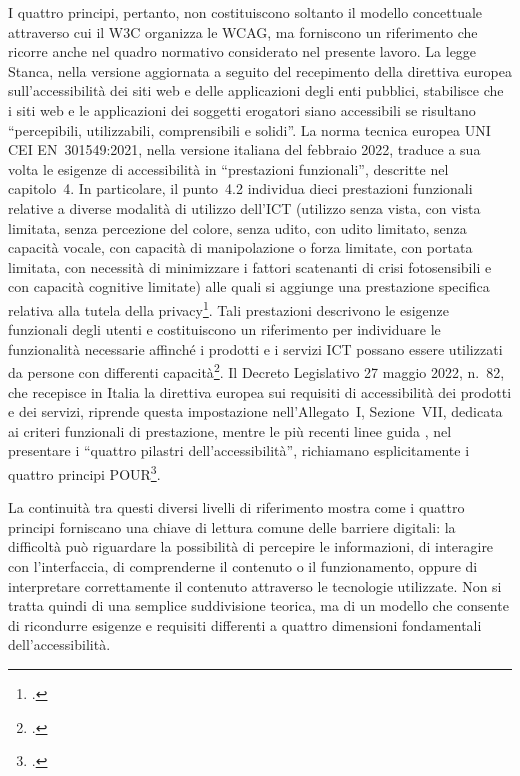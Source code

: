 I quattro principi, pertanto, non costituiscono soltanto il modello concettuale attraverso cui il W3C organizza le WCAG, ma forniscono un riferimento che ricorre anche nel quadro normativo considerato nel presente lavoro. La legge Stanca, nella versione aggiornata a seguito del recepimento della direttiva europea sull'accessibilità dei siti web e delle applicazioni  degli enti pubblici, stabilisce che i siti web e le applicazioni  dei soggetti erogatori siano accessibili se risultano \enquote{percepibili, utilizzabili, comprensibili e solidi}. La norma tecnica europea UNI CEI EN~301549:2021, nella versione italiana del febbraio 2022, traduce a sua volta le esigenze di accessibilità in \enquote{prestazioni funzionali}, descritte nel capitolo~4. In particolare, il punto~4.2 individua dieci prestazioni funzionali relative a diverse modalità di utilizzo dell'ICT (utilizzo senza vista, con vista limitata, senza percezione del colore, senza udito, con udito limitato, senza capacità vocale, con capacità di manipolazione o forza limitate, con portata limitata, con necessità di minimizzare i fattori scatenanti di crisi fotosensibili e con capacità cognitive limitate) alle quali si aggiunge una prestazione specifica relativa alla tutela della privacy\footcite[cap.~4, §~4.2]{norma:en301549}. Tali prestazioni descrivono le esigenze funzionali degli utenti e costituiscono un riferimento per individuare le funzionalità necessarie affinché i prodotti e i servizi ICT possano essere utilizzati da persone con differenti capacità\footcite[cap.~4]{norma:en301549}. Il Decreto Legislativo 27 maggio 2022, n.~82, che recepisce in Italia la direttiva europea sui requisiti di accessibilità dei prodotti e dei servizi, riprende questa impostazione nell'Allegato~I, Sezione~VII, dedicata ai criteri funzionali di prestazione, mentre le più recenti linee guida , nel presentare i \enquote{quattro pilastri dell'accessibilità}, richiamano esplicitamente i quattro principi POUR\footcite[§~6.1]{agid:lg-82-2022}.

La continuità tra questi diversi livelli di riferimento mostra come i quattro principi forniscano una chiave di lettura comune delle barriere digitali: la difficoltà può riguardare la possibilità di percepire le informazioni, di interagire con l'interfaccia, di comprenderne il contenuto o il funzionamento, oppure di interpretare correttamente il contenuto attraverso le tecnologie utilizzate. Non si tratta quindi di una semplice suddivisione teorica, ma di un modello che consente di ricondurre esigenze e requisiti differenti a quattro dimensioni fondamentali dell'accessibilità.

